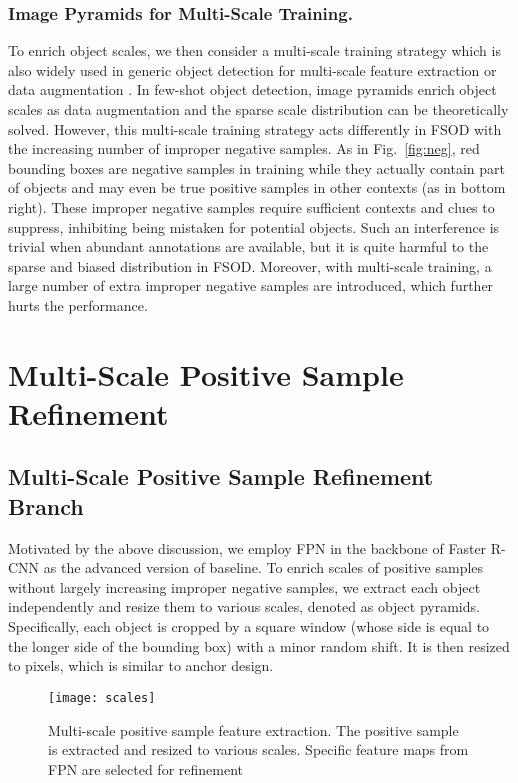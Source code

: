 \documentclass[runningheads]{llncs}
\begin{document}
\subsubsection{Image Pyramids for Multi-Scale Training.} 
To enrich object scales, we then consider a multi-scale training strategy which is also widely used in generic object detection for multi-scale feature extraction \cite{sppnet,fastrcnn} or data augmentation \cite{yolov2}. 
In few-shot object detection, image pyramids enrich object scales as data augmentation and the sparse scale distribution can be theoretically solved.
However, this multi-scale training strategy acts differently in FSOD with the increasing number of improper negative samples.
As in Fig.~\ref{fig:neg}, red bounding boxes are negative samples in training while they actually contain part of objects and may even be true positive samples in other contexts (as in bottom right).
These improper negative samples require sufficient contexts and clues to suppress, inhibiting being mistaken for potential objects. 
Such an interference is trivial when abundant annotations are available, but it is quite harmful to the sparse and biased distribution in FSOD.
Moreover, with multi-scale training, a large number of extra improper negative samples are introduced, which further hurts the performance.

\section{Multi-Scale Positive Sample Refinement}





\subsection{Multi-Scale Positive Sample Refinement Branch}
Motivated by the above discussion, we employ FPN in the backbone of Faster R-CNN as the advanced version of baseline.
To enrich scales of positive samples without largely increasing improper negative samples, we extract each object independently and resize them to various scales, denoted as object pyramids.
Specifically, each object is cropped by a square window (whose side is equal to the longer side of the bounding box) with a minor random shift. It is then resized to  pixels, which is similar to anchor design. 
\begin{figure}
	\centering
	\texttt{[image: scales]}
	\caption{Multi-scale positive sample feature extraction. The positive sample is extracted and resized to various scales. Specific feature maps from FPN are selected for refinement}
	\label{fig:scales}
\end{figure}
\end{document}
